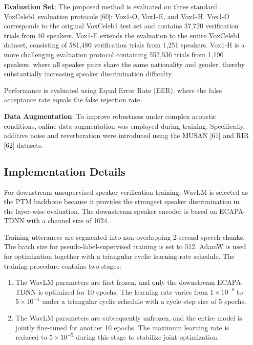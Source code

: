 \documentclass[journal]{IEEEtran}
\begin{document}
\textbf{Evaluation Set}: 
The proposed method is evaluated on three standard VoxCeleb1 evaluation protocols [60]: Vox1-O, Vox1-E, and Vox1-H. Vox1-O corresponds to the original VoxCeleb1 test set and contains 37,720 verification trials from 40 speakers. Vox1-E extends the evaluation to the entire VoxCeleb1 dataset, consisting of 581,480 verification trials from 1,251 speakers. Vox1-H is a more challenging evaluation protocol containing 552,536 trials from 1,190 speakers, where all speaker pairs share the same nationality and gender, thereby substantially increasing speaker discrimination difficulty.

Performance is evaluated using Equal Error Rate (EER), where the false acceptance rate equals the false rejection rate.


\textbf{Data Augmentation}: 
To improve robustness under complex acoustic conditions, online data augmentation was employed during training. Specifically, additive noise and reverberation were introduced using the MUSAN [61] and RIR [62] datasets.
\subsection{Implementation Details}

For downstream unsupervised speaker verification training, WavLM is
selected as the PTM backbone because it provides the strongest
speaker discrimination in the layer-wise evaluation. The downstream
speaker encoder is based on ECAPA-TDNN with a channel size of 1024.

Training utterances are segmented into non-overlapping 2-second
speech chunks. The batch size for pseudo-label-supervised training is
set to 512. AdamW is used for optimization together with a
triangular cyclic learning-rate schedule. The training procedure
contains two stages:

\begin{enumerate}
    \item The WavLM parameters are first frozen, and only the
    downstream ECAPA-TDNN is optimized for 10 epochs. The learning
    rate varies from $1\times10^{-8}$ to $5\times10^{-4}$ under a
    triangular cyclic schedule with a cycle step size of 5 epochs.

    \item The WavLM parameters are subsequently unfrozen, and the
    entire model is jointly fine-tuned for another 10 epochs. The
    maximum learning rate is reduced to $5\times10^{-5}$ during this
    stage to stabilize joint optimization.
\end{enumerate}
\end{document}
